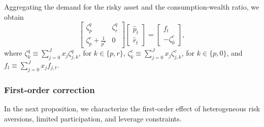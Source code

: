Aggregating the demand for the risky asset and the consumption-wealth ratio, we obtain
\begin{equation}
    \left[
    \begin{matrix}
        \zeta^q_p & \zeta^q_r\\
        \zeta^c_p + \frac{1}{p^*} & 0
    \end{matrix}
    \right]\left[ \begin{matrix}
        \hat{p}_t\\
        \hat{r}_t
    \end{matrix} \right] =
    \left[ \begin{matrix}
        f_t\\
        -\zeta_{0}^c
    \end{matrix} \right],
\end{equation}
where $\zeta^q_{k} \equiv \sum_{j=0}^J x_j \zeta_{j,k}^q$, for $k \in \{p,r\}$, $\zeta^c_{k} \equiv \sum_{j=0}^J x_j \zeta^c_{j,k}$, for $k \in \{p,0\}$, and $f_t \equiv \sum_{j=0}^J x_j f_{j,t}$.







\subsubsection{First-order correction}

In the next proposition, we characterize the first-order effect of heterogeneous risk aversions, limited participation, and leverage constraints.



